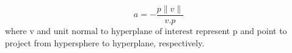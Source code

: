 \begin{equation} \label{eq:linear-proj}
	a=-\frac{p \| v\| }{v.p}
\end{equation}
where $\text{v}$ and $\text{unit normal to hyperplane of interest}$ represent p and point to project from hypersphere to hyperplane, respectively.